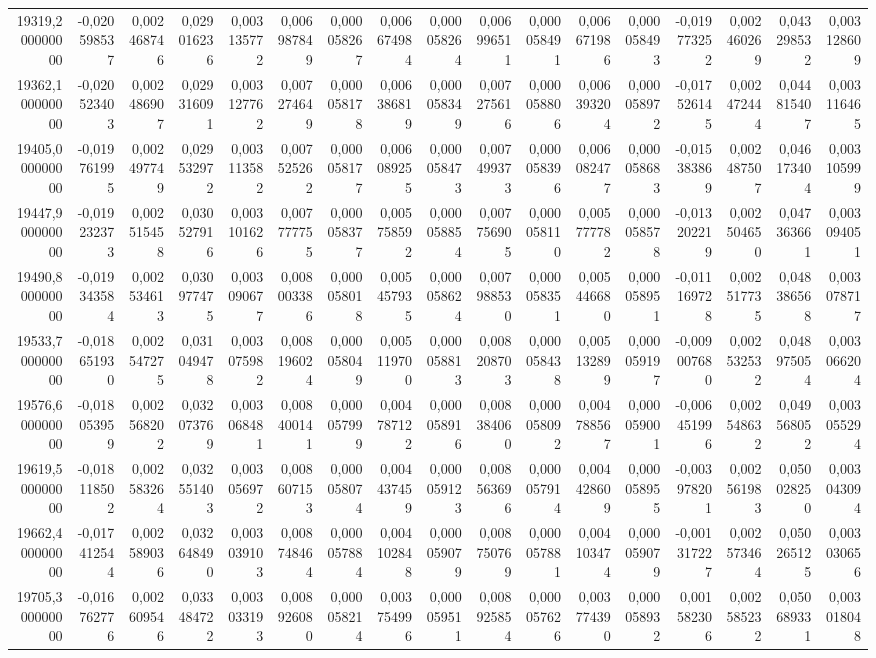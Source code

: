 \begin{longtable}{rrrrrrrrrrrrrrrrr}
19319,200000000 & -0,020598537 & 0,002468746 & 0,029016236 & 0,003135772 & 0,006987849 & 0,000058267 & 0,006674984 & 0,000058264 & 0,006996511 & 0,000058491 & 0,006671986 & 0,000058493 & -0,019773252 & 0,002460269 & 0,043298532 & 0,003128609\\
19362,100000000 & -0,020523403 & 0,002486907 & 0,029316091 & 0,003127762 & 0,007274649 & 0,000058178 & 0,006386819 & 0,000058349 & 0,007275616 & 0,000058806 & 0,006393204 & 0,000058972 & -0,017526145 & 0,002472444 & 0,044815407 & 0,003116465\\
19405,000000000 & -0,019761995 & 0,002497749 & 0,029532972 & 0,003113582 & 0,007525262 & 0,000058177 & 0,006089255 & 0,000058473 & 0,007499373 & 0,000058396 & 0,006082477 & 0,000058683 & -0,015383869 & 0,002487507 & 0,046173404 & 0,003105999\\
19447,900000000 & -0,019232373 & 0,002515458 & 0,030527916 & 0,003101626 & 0,007777755 & 0,000058377 & 0,005758592 & 0,000058854 & 0,007756905 & 0,000058110 & 0,005777782 & 0,000058578 & -0,013202219 & 0,002504650 & 0,047363661 & 0,003094051\\
19490,800000000 & -0,019343584 & 0,002534613 & 0,030977475 & 0,003090677 & 0,008003386 & 0,000058018 & 0,005457935 & 0,000058624 & 0,007988530 & 0,000058351 & 0,005446680 & 0,000058951 & -0,011169728 & 0,002517735 & 0,048386568 & 0,003078717\\
19533,700000000 & -0,018651930 & 0,002547275 & 0,031049478 & 0,003075982 & 0,008196024 & 0,000058049 & 0,005119700 & 0,000058813 & 0,008208703 & 0,000058438 & 0,005132899 & 0,000059197 & -0,009007680 & 0,002532532 & 0,048975054 & 0,003066204\\
19576,600000000 & -0,018053959 & 0,002568202 & 0,032073769 & 0,003068481 & 0,008400141 & 0,000057999 & 0,004787122 & 0,000058916 & 0,008384060 & 0,000058092 & 0,004788567 & 0,000059001 & -0,006451996 & 0,002548632 & 0,049568052 & 0,003055294\\
19619,500000000 & -0,018118502 & 0,002583264 & 0,032551403 & 0,003056972 & 0,008607153 & 0,000058074 & 0,004437459 & 0,000059123 & 0,008563696 & 0,000057914 & 0,004428609 & 0,000058955 & -0,003978201 & 0,002561983 & 0,050028250 & 0,003043094\\
19662,400000000 & -0,017412544 & 0,002589036 & 0,032648490 & 0,003039103 & 0,008748464 & 0,000057884 & 0,004102848 & 0,000059079 & 0,008750769 & 0,000057881 & 0,004103474 & 0,000059079 & -0,001317227 & 0,002573464 & 0,050265125 & 0,003030656\\
19705,300000000 & -0,016762776 & 0,002609546 & 0,033484722 & 0,003033193 & 0,008926080 & 0,000058214 & 0,003754996 & 0,000059511 & 0,008925854 & 0,000057626 & 0,003774390 & 0,000058932 & 0,001582306 & 0,002585232 & 0,050689331 & 0,003018048\\

\end{longtable}
